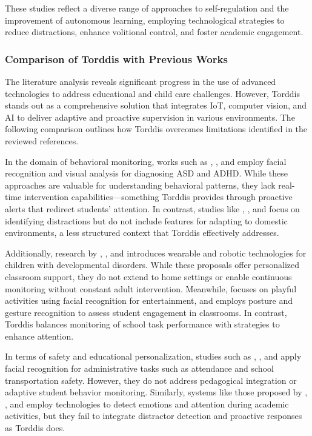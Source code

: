 			These studies reflect a diverse range of approaches to self-regulation and the improvement of autonomous learning, employing technological strategies to reduce distractions, enhance volitional control, and foster academic engagement.
			
		\subsubsection{Comparison of Torddis with Previous Works}
			The literature analysis reveals significant progress in the use of advanced technologies to address educational and child care challenges. However, Torddis stands out as a comprehensive solution that integrates IoT, computer vision, and AI to deliver adaptive and proactive supervision in various environments. The following comparison outlines how Torddis overcomes limitations identified in the reviewed references.
			
			In the domain of behavioral monitoring, works such as \cite{Akter2021}, \cite{Pelc2006}, and \cite{Albrecht2014} employ facial recognition and visual analysis for diagnosing ASD and ADHD. While these approaches are valuable for understanding behavioral patterns, they lack real-time intervention capabilities—something Torddis provides through proactive alerts that redirect students' attention. In contrast, studies like \cite{Campbell2015Using}, \cite{Ucar2022Recognizing}, and \cite{Argel2023Intellitell} focus on identifying distractions but do not include features for adapting to domestic environments, a less structured context that Torddis effectively addresses.
			
			Additionally, research by \cite{Berrezueta-Guzman2021}, \cite{VilliersRader2021}, and \cite{Washington2016AWereable} introduces wearable and robotic technologies for children with developmental disorders. While these proposals offer personalized classroom support, they do not extend to home settings or enable continuous monitoring without constant adult intervention. Meanwhile, \cite{Muller2018ArchnSmile} focuses on playful activities using facial recognition for entertainment, and \cite{Nguyen2019} employs posture and gesture recognition to assess student engagement in classrooms. In contrast, Torddis balances monitoring of school task performance with strategies to enhance attention.
			
			In terms of safety and educational personalization, studies such as \cite{Hachad2020}, \cite{James2019}, and \cite{Boumiza2017} apply facial recognition for administrative tasks such as attendance and school transportation safety. However, they do not address pedagogical integration or adaptive student behavior monitoring. Similarly, systems like those proposed by \cite{DaCosta2023}, \cite{Kumar2024Zoom}, and \cite{Narkhede2023} employ technologies to detect emotions and attention during academic activities, but they fail to integrate distractor detection and proactive responses as Torddis does.
			
